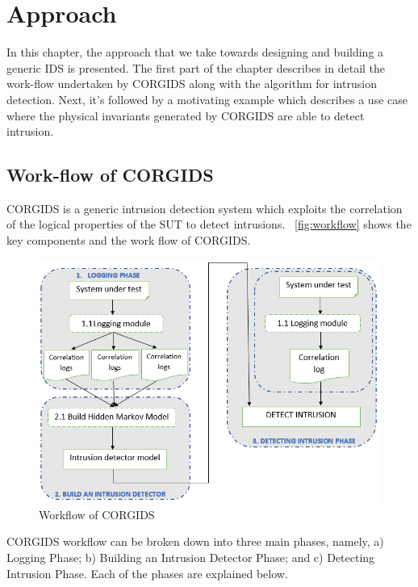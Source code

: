 
\chapter{\textbf{Approach}}
\label{sec3:Approach}

In this chapter, the approach that we take towards designing and building a generic \ac{IDS} is presented. The first part of the chapter describes in detail the work-flow undertaken by \ac{CORGIDS} along with the algorithm for intrusion detection. Next, it's followed by a motivating example which describes a use case where the physical invariants generated by \ac{CORGIDS} are able to detect intrusion.


\section{Work-flow of CORGIDS}
\ac{CORGIDS} is a generic intrusion detection system which exploits the correlation of the logical properties of the \ac{SUT} to detect intrusions. ~\autoref{fig:workflow} shows the key components and the work flow of \ac{CORGIDS}.

\begin{figure}[ht]
    \centering
    \includegraphics[scale=0.65,keepaspectratio = true]{Graphics/CORGIDSWorkflowNew.png}
    \caption{Workflow of CORGIDS}
    \label{fig:workflow}
\end{figure}

\ac{CORGIDS} workflow can be broken down into three main phases, namely, a) Logging Phase; b) Building an Intrusion Detector Phase; and c) Detecting Intrusion Phase. Each of the phases are explained below.

